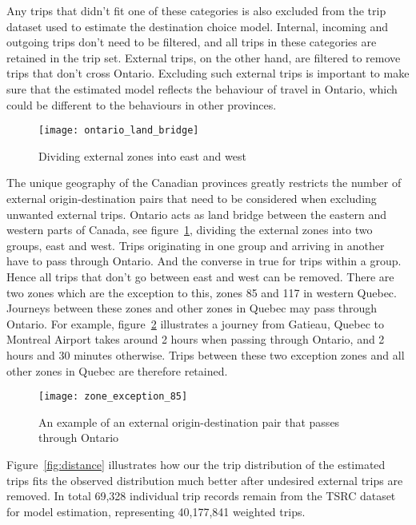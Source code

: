 Any trips that didn't fit one of these categories is also excluded from the trip dataset used to estimate the destination choice model. Internal, incoming and outgoing trips don't need to be filtered, and all trips in these categories are retained in the trip set. External trips, on the other hand, are filtered to remove trips that don't cross Ontario. Excluding such external trips is important to make sure that the estimated model reflects the behaviour of travel in Ontario, which could be different to the behaviours in other provinces. 

\begin{figure}[H]
\centering
\texttt{[image: ontario\_land\_bridge]}
\caption{Dividing external zones into east and west}
\label{fig:bridge}
\end{figure}

The unique geography of the Canadian provinces greatly restricts the number of external origin-destination pairs that need to be considered when excluding unwanted external trips. Ontario acts as land bridge between the eastern and western parts of Canada, see figure~\ref{fig:bridge}, dividing the external zones into two groups, east and west. Trips originating in one group and arriving in another have to pass through Ontario. And the converse in true for trips within a group. Hence all trips that don't go between east and west can be removed. There are two zones which are the exception to this, zones 85 and 117 in western Quebec. Journeys between these zones and other zones in Quebec may pass through Ontario. For example, figure~\ref{fig:exception85} illustrates a journey from Gatieau, Quebec to Montreal Airport takes around 2 hours when passing through Ontario, and 2 hours and 30 minutes otherwise. Trips between these two exception zones and all other zones in Quebec are therefore retained. 

\begin{figure}[H]
\centering
\texttt{[image: zone\_exception\_85]}
\caption{An example of an external origin-destination pair that passes through Ontario}
\label{fig:exception85}
\end{figure}


Figure~\ref{fig:distance} illustrates how our the trip distribution of the estimated trips fits the observed distribution much better after undesired external trips are removed. In total 69,328 individual trip records remain from the TSRC dataset for model estimation, representing 40,177,841 weighted trips.

